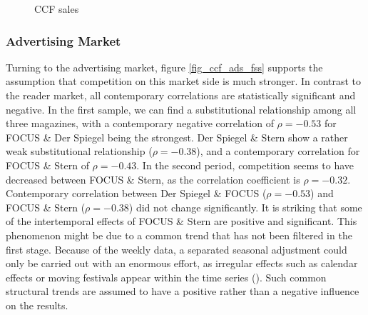 \documentclass[12pt,a4paper,notitlepage]{article}
\begin{document}
\begin{figure}[H]\centering
\caption{CCF sales}
	\label{fig_ccf_sales_fss}
\end{figure}


\subsubsection{Advertising Market}
Turning to the advertising market, figure \ref{fig_ccf_ads_fss} supports the assumption that competition on this market side is much stronger. In contrast to the reader market, all contemporary correlations are statistically significant and negative. In the first sample, we can find a substitutional relationship among all three magazines, with a contemporary negative correlation of $\rho=-0.53$ for FOCUS \& Der Spiegel being the strongest. Der Spiegel \& Stern show a rather weak substitutional relationship ($\rho=-0.38$), and a contemporary correlation for FOCUS \& Stern of $\rho=-0.43$. In the second period, competition seems to have decreased between FOCUS \& Stern, as the correlation coefficient is $\rho=-0.32$. Contemporary correlation between Der Spiegel \& FOCUS ($\rho=-0.53$) and FOCUS \& Stern ($\rho=-0.38$) did not change significantly. It is striking that some of the intertemporal effects of FOCUS \& Stern are positive and significant. This phenomenon might be due to a common trend that has not been filtered in the first stage. Because of the weekly data, a separated seasonal adjustment could only be carried out with an enormous effort, as irregular effects such as calendar effects or moving festivals appear within the time series (\cite{harvey_modeling_1997}). Such common structural trends are assumed to have a positive rather than a negative influence on the results. 
\end{document}
